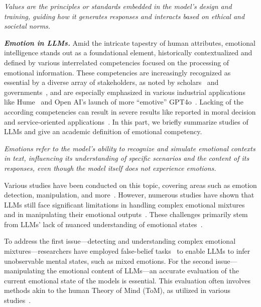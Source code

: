 \begin{tcolorbox}[definition]
\textit{Values are the principles or standards embedded in the model's design and training, guiding how it generates responses and interacts based on ethical and societal norms.}
\end{tcolorbox}


\textit{\textbf{Emotion in LLMs.}} Amid the intricate tapestry of human attributes, emotional intelligence stands out as a foundational element, historically contextualized and defined by various interrelated competencies focused on the processing of emotional information. These competencies are increasingly recognized as essential by a diverse array of stakeholders, as noted by scholars~\cite{Ke2024ExploringTF, Normoyle2024UsingLT} and governments~\cite{Guardian_emtions, Medium_emtions}, and are especially emphasized in various industrial applications like Hume~\cite{hume_emtions} and Open AI’s launch of more “emotive” GPT4o~\cite{oprn_emtions}. Lacking of the according competencies can result in severe results like reported in moral decision and service-oriented applications~\cite{balomenos2005emotion, lei2023instructerc}. In this part, we briefly summarize studies of LLMs and give an academic definition of emotional competency. 

\begin{tcolorbox}[definition]
\textit{Emotions refer to the model's ability to recognize and simulate emotional contexts in text, influencing its understanding of specific scenarios and the content of its responses, even though the model itself does not experience emotions.}
\end{tcolorbox}

Various studies have been conducted on this topic, covering areas such as emotion detection, manipulation, and more~\cite{picard2001toward, minsky2007emotion, li2024quantifying, li2024think}. However, numerous studies have shown that LLMs still face significant limitations in handling complex emotional mixtures~\cite{devillers2005challenges} and in manipulating their emotional outputs~\cite{Street2024LLMTO, CarrascoFarr2024LargeLM}. These challenges primarily stem from LLMs' lack of nuanced understanding of emotional states~\cite{luo2024nus}.

To address the first issue—detecting and understanding complex emotional mixtures—researchers have employed false-belief tasks~\cite{ToMTest, vanduijn2023theory} to enable LLMs to infer unobservable mental states, such as mixed emotions. For the second issue—manipulating the emotional content of LLMs—an accurate evaluation of the current emotional state of the models is essential. This evaluation often involves methods akin to the human Theory of Mind (ToM), as utilized in various studies~\cite{bubeck2023sparks, kosinski2023theory, ullman2023large}.

